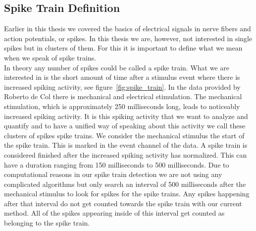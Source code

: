 \subsection{Spike Train Definition}
Earlier in this thesis we covered the basics of electrical signals in nerve fibers and action potentials, or spikes. In this thesis we are, however, not interested in single spikes but in clusters of them. For this it is important to define what we mean when we speak of spike trains.\\
In theory any number of spikes could be called a spike train. What we are interested in is the short amount of time after a stimulus event where there is increased spiking activity, see figure~\ref{fig:spike_train}. In the data provided by Roberto de Col there is mechanical and electrical stimulation. The mechanical stimulation, which is approximately 250 milliseconds long, leads to noticeably increased spiking activity. It is this spiking activity that we want to analyze and quantify and to have a unified way of speaking about this activity we call these clusters of spikes spike trains. We consider the mechanical stimulus the start of the spike train. This is marked in the event channel of the data. A spike train is considered finished after the increased spiking activity has normalized. This can have a duration ranging from 150 milliseconds to 500 milliseconds. Due to computational reasons in our spike train detection we are not using any complicated algorithms but only search an interval of 500 milliseconds after the mechanical stimulus to look for spikes for the spike trains. Any spikes happening after that interval do not get counted towards the spike train with our current method. All of the spikes appearing inside of this interval get counted as belonging to the spike train.

